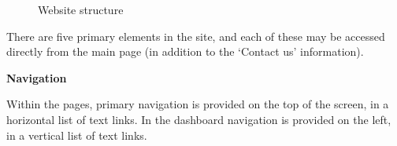 \documentclass{l3proj}
\begin{document}
\begin{figure}[H]
\begin{center}
		\qquad

	\end{center}
	\label{fig:website-structure}
	\vspace{-50pt}
	\caption{Website structure}
\end{figure}


There are five primary elements in the site, and each of these may
be accessed directly from the main page (in addition to the ‘Contact
us’ information).

\textbf{Navigation}

Within the pages, primary navigation is provided on the top of the
screen, in a horizontal list of text links. In the dashboard navigation is
provided on the left, in a vertical list of text links.
\end{document}
